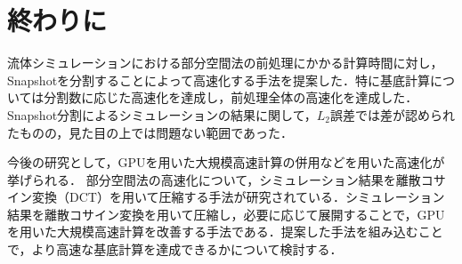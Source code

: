 \documentclass[a4j,12pt]{jreport}
\begin{document}
\chapter{終わりに}
流体シミュレーションにおける部分空間法の前処理にかかる計算時間に対し，Snapshotを分割することによって高速化する手法を提案した．特に基底計算については分割数に応じた高速化を達成し，前処理全体の高速化を達成した．Snapshot分割によるシミュレーションの結果に関して，$L_2$誤差では差が認められたものの，見た目の上では問題ない範囲であった．

今後の研究として，GPUを用いた大規模高速計算の併用などを用いた高速化が挙げられる．
部分空間法の高速化について，シミュレーション結果を離散コサイン変換（DCT）を用いて圧縮する手法\cite{subspaceDCT}が研究されている．シミュレーション結果を離散コサイン変換を用いて圧縮し，必要に応じて展開することで，GPUを用いた大規模高速計算を改善する手法である．提案した手法を組み込むことで，より高速な基底計算を達成できるかについて検討する．



\end{document}

